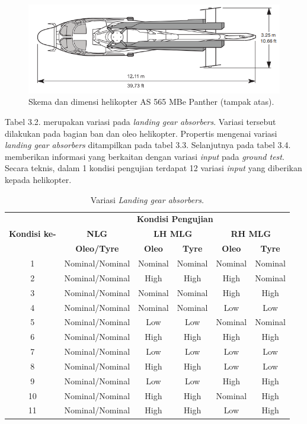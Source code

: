 \begin{figure}[H]
	\centering
	\includegraphics[width=0.8\linewidth]{gambar/tampak_atas.png}
	\caption{Skema dan dimensi helikopter AS 565 MBe Panther (tampak atas).}
	\label{tampak_atas.png}
\end{figure}

Tabel 3.2. merupakan variasi pada \textit{landing gear absorbers}. Variasi tersebut dilakukan pada bagian ban dan oleo helikopter. Propertis mengenai variasi \textit{landing gear absorbers} ditampilkan pada tabel 3.3. Selanjutnya pada tabel 3.4. memberikan informasi yang berkaitan dengan variasi \textit{input} pada \textit{ground test}. Secara teknis, dalam 1 kondisi pengujian terdapat 12 variasi \textit{input} yang diberikan kepada helikopter. 

\begin{longtable}{|c|c|c|c|c|c|} 
	\caption{Variasi \textit{Landing gear absorbers.}}
	\label{tb:variasilanding}								\\	
	\hline
	\multirow{3}{3em}{\centering \textbf{Kondisi ke-}}&\multicolumn{5}{|c|}{\textbf{Kondisi Pengujian}} \\
	\cline{2-6}
	& \textbf{NLG }& \multicolumn{2}{|c|}{\textbf{LH MLG}} & \multicolumn{2}{|c|}{\textbf{RH MLG}}\\
	\cline{2-6}
	& \textbf{Oleo/Tyre }&\textbf{Oleo}&\textbf{Tyre}&\textbf{Oleo }& \textbf{Tyre }\\
	\hline
	1 &	Nominal/Nominal & Nominal & Nominal & Nominal & Nominal \\
	\hline
	2 & Nominal/Nominal & High	  & High	& High	  & Nominal \\
	\hline
	3 & Nominal/Nominal & Nominal & Nominal	& High	  & High    \\
	\hline
	4 & Nominal/Nominal & Nominal & Nominal	& Low	  & Low	    \\
	\hline
	5 & Nominal/Nominal & Low	  & Low 	& Nominal & Nominal \\
	\hline
	6 & Nominal/Nominal & High	  & High	& High	  & High    \\
	\hline
	7 & Nominal/Nominal & Low	  & Low 	& Low	  & Low     \\
	\hline
	8 & Nominal/Nominal & High	  & High	& Low	  & Low     \\
	\hline
	9 & Nominal/Nominal & Low	  & Low	    & High	  & High 	\\
	\hline
	10 & Nominal/Nominal & High	  & High	& Nominal & High 	\\
	\hline
	11 & Nominal/Nominal & High	  & High	& Low	  & High 	\\
	\hline
\end{longtable}

